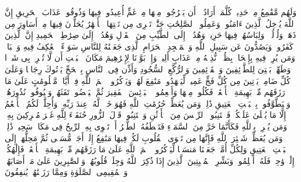\stopbuffer%
\startbuffer[\q:22:21]
وَلَهُم مَّقَٰمِعُ مِنۡ حَدِیدࣲ%
\stopbuffer%
\startbuffer[\q:22:22]
كُلَّمَاۤ أَرَادُوۤا۟ أَن یَخۡرُجُوا۟ مِنۡهَا مِنۡ غَمٍّ أُعِیدُوا۟ فِیهَا وَذُوقُوا۟ عَذَابَ ٱلۡحَرِیقِ%
\stopbuffer%
\startbuffer[\q:22:23]
إِنَّ ٱللَّهَ یُدۡخِلُ ٱلَّذِینَ ءَامَنُوا۟ وَعَمِلُوا۟ ٱلصَّٰلِحَٰتِ جَنَّٰتࣲ تَجۡرِی مِن تَحۡتِهَا ٱلۡأَنۡهَٰرُ یُحَلَّوۡنَ فِیهَا مِنۡ أَسَاوِرَ مِن ذَهَبࣲ وَلُؤۡلُؤࣰاۖ وَلِبَاسُهُمۡ فِیهَا حَرِیرࣱ%
\stopbuffer%
\startbuffer[\q:22:24]
وَهُدُوۤا۟ إِلَى ٱلطَّیِّبِ مِنَ ٱلۡقَوۡلِ وَهُدُوۤا۟ إِلَىٰ صِرَٰطِ ٱلۡحَمِیدِ%
\stopbuffer%
\startbuffer[\q:22:25]
إِنَّ ٱلَّذِینَ كَفَرُوا۟ وَیَصُدُّونَ عَن سَبِیلِ ٱللَّهِ وَٱلۡمَسۡجِدِ ٱلۡحَرَامِ ٱلَّذِی جَعَلۡنَٰهُ لِلنَّاسِ سَوَاۤءً ٱلۡعَٰكِفُ فِیهِ وَٱلۡبَادِۚ وَمَن یُرِدۡ فِیهِ بِإِلۡحَادِۭ بِظُلۡمࣲ نُّذِقۡهُ مِنۡ عَذَابٍ أَلِیمࣲ%
\stopbuffer%
\startbuffer[\q:22:26]
وَإِذۡ بَوَّأۡنَا لِإِبۡرَٰهِیمَ مَكَانَ ٱلۡبَیۡتِ أَن لَّا تُشۡرِكۡ بِی شَیۡءࣰا وَطَهِّرۡ بَیۡتِیَ لِلطَّاۤئِفِینَ وَٱلۡقَاۤئِمِینَ وَٱلرُّكَّعِ ٱلسُّجُودِ%
\stopbuffer%
\startbuffer[\q:22:27]
وَأَذِّن فِی ٱلنَّاسِ بِٱلۡحَجِّ یَأۡتُوكَ رِجَالࣰا وَعَلَىٰ كُلِّ ضَامِرࣲ یَأۡتِینَ مِن كُلِّ فَجٍّ عَمِیقࣲ%
\stopbuffer%
\startbuffer[\q:22:28]
لِّیَشۡهَدُوا۟ مَنَٰفِعَ لَهُمۡ وَیَذۡكُرُوا۟ ٱسۡمَ ٱللَّهِ فِیۤ أَیَّامࣲ مَّعۡلُومَٰتٍ عَلَىٰ مَا رَزَقَهُم مِّنۢ بَهِیمَةِ ٱلۡأَنۡعَٰمِۖ فَكُلُوا۟ مِنۡهَا وَأَطۡعِمُوا۟ ٱلۡبَاۤئِسَ ٱلۡفَقِیرَ%
\stopbuffer%
\startbuffer[\q:22:29]
ثُمَّ لۡیَقۡضُوا۟ تَفَثَهُمۡ وَلۡیُوفُوا۟ نُذُورَهُمۡ وَلۡیَطَّوَّفُوا۟ بِٱلۡبَیۡتِ ٱلۡعَتِیقِ%
\stopbuffer%
\startbuffer[\q:22:30]
ذَٰلِكَۖ وَمَن یُعَظِّمۡ حُرُمَٰتِ ٱللَّهِ فَهُوَ خَیۡرࣱ لَّهُۥ عِندَ رَبِّهِۦۗ وَأُحِلَّتۡ لَكُمُ ٱلۡأَنۡعَٰمُ إِلَّا مَا یُتۡلَىٰ عَلَیۡكُمۡۖ فَٱجۡتَنِبُوا۟ ٱلرِّجۡسَ مِنَ ٱلۡأَوۡثَٰنِ وَٱجۡتَنِبُوا۟ قَوۡلَ ٱلزُّورِ%
\stopbuffer%
\startbuffer[\q:22:31]
حُنَفَاۤءَ لِلَّهِ غَیۡرَ مُشۡرِكِینَ بِهِۦۚ وَمَن یُشۡرِكۡ بِٱللَّهِ فَكَأَنَّمَا خَرَّ مِنَ ٱلسَّمَاۤءِ فَتَخۡطَفُهُ ٱلطَّیۡرُ أَوۡ تَهۡوِی بِهِ ٱلرِّیحُ فِی مَكَانࣲ سَحِیقࣲ%
\stopbuffer%
\startbuffer[\q:22:32]
ذَٰلِكَۖ وَمَن یُعَظِّمۡ شَعَٰۤئِرَ ٱللَّهِ فَإِنَّهَا مِن تَقۡوَى ٱلۡقُلُوبِ%
\stopbuffer%
\startbuffer[\q:22:33]
لَكُمۡ فِیهَا مَنَٰفِعُ إِلَىٰۤ أَجَلࣲ مُّسَمࣰّى ثُمَّ مَحِلُّهَاۤ إِلَى ٱلۡبَیۡتِ ٱلۡعَتِیقِ%
\stopbuffer%
\startbuffer[\q:22:34]
وَلِكُلِّ أُمَّةࣲ جَعَلۡنَا مَنسَكࣰا لِّیَذۡكُرُوا۟ ٱسۡمَ ٱللَّهِ عَلَىٰ مَا رَزَقَهُم مِّنۢ بَهِیمَةِ ٱلۡأَنۡعَٰمِۗ فَإِلَٰهُكُمۡ إِلَٰهࣱ وَٰحِدࣱ فَلَهُۥۤ أَسۡلِمُوا۟ۗ وَبَشِّرِ ٱلۡمُخۡبِتِینَ%
\stopbuffer%
\startbuffer[\q:22:35]
ٱلَّذِینَ إِذَا ذُكِرَ ٱللَّهُ وَجِلَتۡ قُلُوبُهُمۡ وَٱلصَّٰبِرِینَ عَلَىٰ مَاۤ أَصَابَهُمۡ وَٱلۡمُقِیمِی ٱلصَّلَوٰةِ وَمِمَّا رَزَقۡنَٰهُمۡ یُنفِقُونَ%
